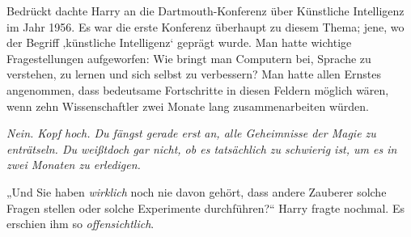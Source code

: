 Bedrückt dachte Harry an die Dartmouth-Konferenz über Künstliche Intelligenz im Jahr 1956. Es war die erste Konferenz überhaupt zu diesem Thema; jene, wo der Begriff ‚künstliche Intelligenz‘ geprägt wurde. Man hatte wichtige Fragestellungen aufgeworfen: Wie bringt man Computern bei, Sprache zu verstehen, zu lernen und sich selbst zu verbessern? Man hatte allen Ernstes angenommen, dass bedeutsame Fortschritte in diesen Feldern möglich wären, wenn zehn Wissenschaftler zwei Monate lang zusammenarbeiten würden.

\emph{Nein. Kopf hoch. Du fängst gerade erst an, alle Geheimnisse der Magie zu enträtseln. Du \emph{weißt}doch gar nicht, ob es tatsächlich zu schwierig ist, um es in zwei Monaten zu erledigen.}

„Und Sie haben \emph{wirklich} noch nie davon gehört, dass andere Zauberer solche Fragen stellen oder solche Experimente durchführen?“ Harry fragte nochmal. Es erschien ihm so \emph{offensichtlich}.

